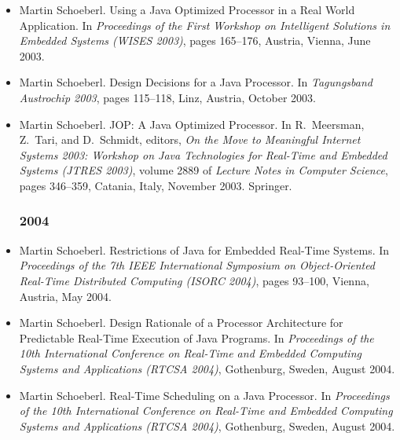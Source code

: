 
\begin{itemize}

\subsubsection*{2003}

\item Martin Schoeberl.
 Using a {J}ava Optimized Processor in a Real World Application.
 In {\em Proceedings of the First Workshop on Intelligent Solutions in
  Embedded Systems (WISES 2003)}, pages 165--176, Austria, Vienna, June 2003.

\item Martin Schoeberl.
 Design Decisions for a {J}ava Processor.
 In {\em Tagungsband Austrochip 2003}, pages 115--118, Linz, Austria,
  October 2003.

\item Martin Schoeberl.
 {JOP}: {A} {J}ava Optimized Processor.
 In R.~Meersman, Z.~Tari, and D.~Schmidt, editors, {\em On the Move to
  Meaningful Internet Systems 2003: Workshop on {J}ava Technologies for
  Real-Time and Embedded Systems (JTRES 2003)}, volume 2889 of {\em Lecture
  Notes in Computer Science}, pages 346--359, Catania, Italy, November 2003.
  Springer.

\subsubsection*{2004}

\item Martin Schoeberl.
 Restrictions of {J}ava for Embedded Real-Time Systems.
 In {\em Proceedings of the 7th IEEE International Symposium on
  Object-Oriented Real-Time Distributed Computing (ISORC 2004)}, pages
  93--100, Vienna, Austria, May 2004.

\item Martin Schoeberl.
 Design Rationale of a Processor Architecture for Predictable
  Real-Time Execution of {J}ava Programs.
 In {\em Proceedings of the 10th International Conference on
  Real-Time and Embedded Computing Systems and Applications (RTCSA 2004)},
  Gothenburg, Sweden, August 2004.

\item Martin Schoeberl.
 Real-Time Scheduling on a {J}ava Processor.
 In {\em Proceedings of the 10th International Conference on
  Real-Time and Embedded Computing Systems and Applications (RTCSA 2004)},
  Gothenburg, Sweden, August 2004.


\end{itemize}
